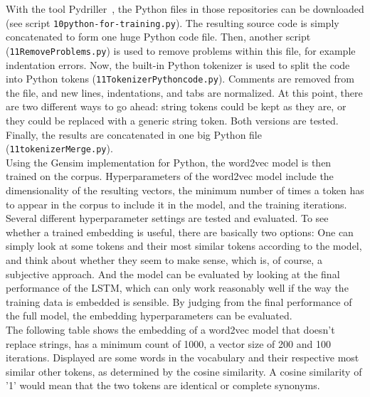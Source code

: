 \documentclass[
a4paper,
pagesize,
pdftex,
12pt,
twoside, %
BCOR=5mm, %
ngerman,
fleqn,
final,
]{scrartcl}
\begin{document}
	\normalsize
	With the tool Pydriller~\cite{Spadini.2018}, the Python files in those repositories can be downloaded (see script \texttt{10python-for-training.py}). The resulting source code is simply concatenated to form one huge Python code file. Then, another script (\texttt{11RemoveProblems.py}) is used to remove problems within this file, for example indentation errors. Now, the built-in Python tokenizer is used to split the code into Python tokens (\texttt{11TokenizerPythoncode.py}). Comments are removed from the file, and new lines, indentations, and tabs are normalized. At this point, there are two different ways to go ahead: string tokens could be kept as they are, or they could be replaced with a generic string token. Both versions are tested. Finally, the results are concatenated in one big Python file (\texttt{11tokenizerMerge.py}).\\
	Using the Gensim implementation for Python, the word2vec model is then trained on the corpus. Hyperparameters of the word2vec model include the dimensionality of the resulting vectors, the minimum number of times a token has to appear in the corpus to include it in the model, and the training iterations. Several different hyperparameter settings are tested and evaluated. To see whether a trained embedding is useful, there are basically two options: One can simply look at some tokens and their most similar tokens according to the model, and think about whether they seem to make sense, which is, of course, a subjective approach. And the model can be evaluated by looking at the final performance of the LSTM, which can only work reasonably well if the way the training data is embedded is sensible. By judging from the final performance of the full model, the embedding hyperparameters can be evaluated.\\
	The following table shows the embedding of a word2vec model that doesn't replace strings, has a minimum count of 1000, a vector size of 200 and 100 iterations. Displayed are some words in the vocabulary and their respective most similar other tokens, as determined by the cosine similarity. A cosine similarity of '1' would mean that the two tokens are identical or complete synonyms.
	
\end{document}
